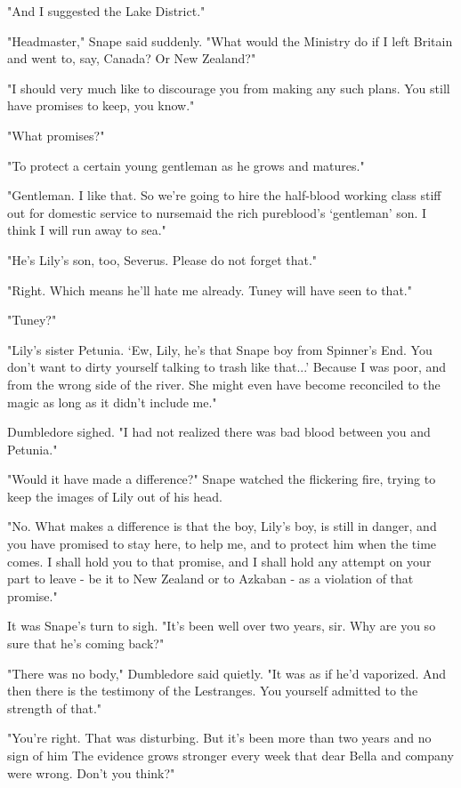 \documentclass[a4paper,11pt]{article}
\begin{document}
"And I suggested the Lake District."

"Headmaster," Snape said suddenly. "What would the Ministry do if I left Britain and went to, say, Canada? Or New Zealand?"

"I should very much like to discourage you from making any such plans. You still have promises to keep, you know."

"What promises?"

"To protect a certain young gentleman as he grows and matures."

"Gentleman. I like that. So we're going to hire the half-blood working class stiff out for domestic service to nursemaid the rich pureblood's `gentleman' son. I think I will run away to sea."

"He's Lily's son, too, Severus. Please do not forget that."

"Right. Which means he'll hate me already. Tuney will have seen to that."

"Tuney?"

"Lily's sister Petunia. `Ew, Lily, he's that Snape boy from Spinner's End. You don't want to dirty yourself talking to trash like that...' Because I was poor, and from the wrong side of the river. She might even have become reconciled to the magic as long as it didn't include me."

Dumbledore sighed. "I had not realized there was bad blood between you and Petunia."

"Would it have made a difference?" Snape watched the flickering fire, trying to keep the images of Lily out of his head.

"No. What makes a difference is that the boy, Lily's boy, is still in danger, and you have promised to stay here, to help me, and to protect him when the time comes. I shall hold you to that promise, and I shall hold any attempt on your part to leave - be it to New Zealand or to Azkaban - as a violation of that promise."

It was Snape's turn to sigh. "It's been well over two years, sir. Why are you so sure that he's coming back?"

"There was no body," Dumbledore said quietly. "It was as if he'd vaporized. And then there is the testimony of the Lestranges. You yourself admitted to the strength of that."

"You're right. That was disturbing. But it's been more than two years and no sign of him The evidence grows stronger every week that dear Bella and company were wrong. Don't you think?"
\end{document}
